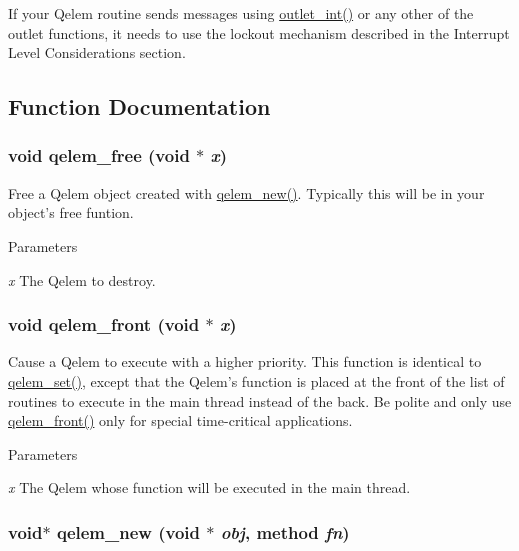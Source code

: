 If your Qelem routine sends messages using \hyperlink{group__inout_ga0b2b38216f2f4dba486bfcd2273f255e}{outlet\_\-int()} or any other of the outlet functions, it needs to use the lockout mechanism described in the Interrupt Level Considerations section. 

\subsection{Function Documentation}
\hypertarget{group__qelems_ga7cfcb3134eb0baf335847906a14a08d0}{
\subsubsection[{qelem\_\-free}]{\setlength{\rightskip}{0pt plus 5cm}void qelem\_\-free (void $\ast$ {\em x})}}
\label{group__qelems_ga7cfcb3134eb0baf335847906a14a08d0}


Free a Qelem object created with \hyperlink{group__qelems_gaffa7e9d4d5468a8ae3c825a353609b1b}{qelem\_\-new()}. Typically this will be in your object’s free funtion.


\begin{DoxyParams}{Parameters}
\item[{\em x}]The Qelem to destroy. \end{DoxyParams}
\hypertarget{group__qelems_gab5fa3e43e7851d1a2049ee28f5275955}{
\subsubsection[{qelem\_\-front}]{\setlength{\rightskip}{0pt plus 5cm}void qelem\_\-front (void $\ast$ {\em x})}}
\label{group__qelems_gab5fa3e43e7851d1a2049ee28f5275955}


Cause a Qelem to execute with a higher priority. This function is identical to \hyperlink{group__qelems_ga3e292aad133af89a87e167e88cc4a1b5}{qelem\_\-set()}, except that the Qelem’s function is placed at the front of the list of routines to execute in the main thread instead of the back. Be polite and only use \hyperlink{group__qelems_gab5fa3e43e7851d1a2049ee28f5275955}{qelem\_\-front()} only for special time-\/critical applications.


\begin{DoxyParams}{Parameters}
\item[{\em x}]The Qelem whose function will be executed in the main thread. \end{DoxyParams}
\hypertarget{group__qelems_gaffa7e9d4d5468a8ae3c825a353609b1b}{
\subsubsection[{qelem\_\-new}]{\setlength{\rightskip}{0pt plus 5cm}void$\ast$ qelem\_\-new (void $\ast$ {\em obj}, \/  {\bf method} {\em fn})}}
\label{group__qelems_gaffa7e9d4d5468a8ae3c825a353609b1b}


